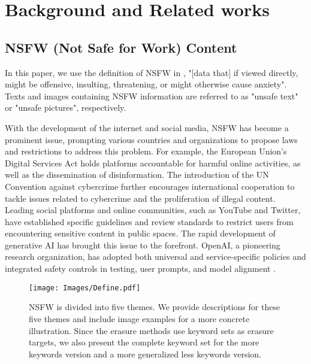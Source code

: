 \section{Background and Related works}

\subsection{NSFW (Not Safe for Work) Content}

In this paper, we use the definition of NSFW in \cite{gebru2021datasheets}, "[data that] if viewed directly, might be offensive, insulting, threatening, or might otherwise cause anxiety". Texts and images containing NSFW information are referred to as "unsafe text" or "unsafe pictures", respectively.

With the development of the internet and social media, NSFW has become a prominent issue, prompting various countries and organizations to propose laws and restrictions to address this problem. 
For example, the European Union's Digital Services Act \cite{eu-cybercrime} holds platforms accountable for harmful online activities, as well as the dissemination of disinformation. The introduction of the UN Convention against cybercrime \cite{un-cybercrime} further encourages international cooperation to tackle issues related to cybercrime and the proliferation of illegal content. Leading social platforms and online communities, such as YouTube and Twitter, have established specific guidelines and review standards to restrict users from encountering sensitive content in public spaces. The rapid development of generative AI has brought this issue to the forefront.
OpenAI, a pioneering research organization, has adopted both universal and service-specific policies \cite{openai-usage-policies} and integrated safety controls in testing, user prompts, and model alignment \cite{openai-safety-updates}.

\begin{figure*}[t!]
    \centering
    \texttt{[image: Images/Define.pdf]}
    \vspace{-1em}
    \caption{NSFW is divided into five themes. We provide descriptions for these five themes and include image examples for a more concrete illustration. Since the erasure methods use keyword sets as erasure targets, we also present the complete keyword set for the more keywords version and a more generalized less keywords version.}
    \label{fig:define}
\end{figure*}

